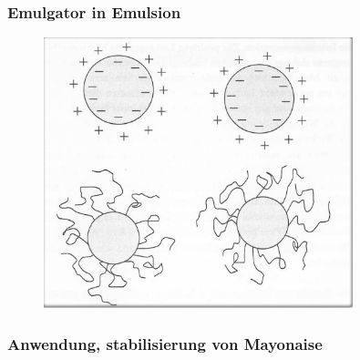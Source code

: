\documentclass{beamer} %
\begin{document}
\begin{frame}
\frametitle{Emulgator in Emulsion}
\begin{figure}
\centering
\includegraphics[width = 0.8\textwidth]{Wassertropfen.jpg}
\end{figure}
\end{frame}

\begin{frame}
\frametitle{Anwendung, stabilisierung von Mayonaise}
\end{frame}
\end{document}
